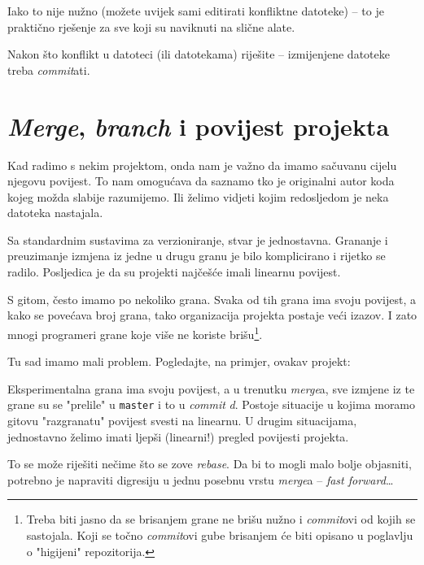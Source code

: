 
Iako to nije nužno (možete uvijek sami editirati konfliktne datoteke) -- to je praktično rješenje za sve koji su naviknuti na slične alate.

Nakon što konflikt u datoteci (ili datotekama) riješite -- izmijenjene datoteke treba \emph{commit}ati.

\section*{\emph{Merge}, \emph{branch} i povijest projekta}

Kad radimo s nekim projektom, onda nam je važno da imamo sačuvanu cijelu njegovu povijest.
To nam omogućava da saznamo tko je originalni autor koda kojeg možda slabije razumijemo.
Ili želimo vidjeti kojim redosljedom je neka datoteka nastajala.

Sa standardnim sustavima za verzioniranje, stvar je jednostavna. 
Grananje i preuzimanje izmjena iz jedne u drugu granu je bilo komplicirano i rijetko se radilo. 
Posljedica je da su projekti najčešće imali linearnu povijest.



S gitom, često imamo po nekoliko grana.
Svaka od tih grana ima svoju povijest, a kako se povećava broj grana, tako organizacija projekta postaje veći izazov.
I zato mnogi programeri grane koje više ne koriste brišu\footnote{Treba biti jasno da se brisanjem grane ne brišu nužno i \emph{commit}ovi od kojih se sastojala. Koji se točno \emph{commit}ovi gube brisanjem će biti opisano u poglavlju o "higijeni" repozitorija.}.

Tu sad imamo mali problem.
Pogledajte, na primjer, ovakav projekt:



Eksperimentalna grana ima svoju povijest, a u trenutku \emph{merge}a, sve izmjene iz te grane su se "prelile" u \verb+master+ i to u \emph{commit} \emph d.
Postoje situacije u kojima moramo gitovu "razgranatu" povijest svesti na linearnu.
U drugim situacijama, jednostavno želimo imati ljepši (linearni!) pregled povijesti projekta.

To se može riješiti nečime što se zove \emph{rebase}.
Da bi to mogli malo bolje objasniti, potrebno je napraviti digresiju u jednu posebnu vrstu \emph{merge}a -- \emph{fast forward}\dots

